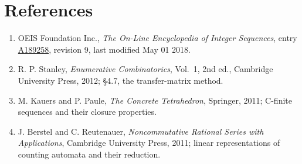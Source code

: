 \documentclass[11pt]{article}
\theoremstyle{definition}
\begin{document}
\section{References}

\begin{enumerate}

\item OEIS Foundation Inc., \emph{The On-Line Encyclopedia of Integer Sequences}, entry \href{https://oeis.org/A189258}{A189258}, revision 9, last modified May 01 2018.

\item R. P. Stanley, \emph{Enumerative Combinatorics}, Vol.~1, 2nd ed., Cambridge University Press, 2012; \S4.7, the transfer-matrix method.

\item M. Kauers and P. Paule, \emph{The Concrete Tetrahedron}, Springer, 2011; C-finite sequences and their closure properties.

\item J. Berstel and C. Reutenauer, \emph{Noncommutative Rational Series with Applications}, Cambridge University Press, 2011; linear representations of counting automata and their reduction.

\end{enumerate}
\end{document}
